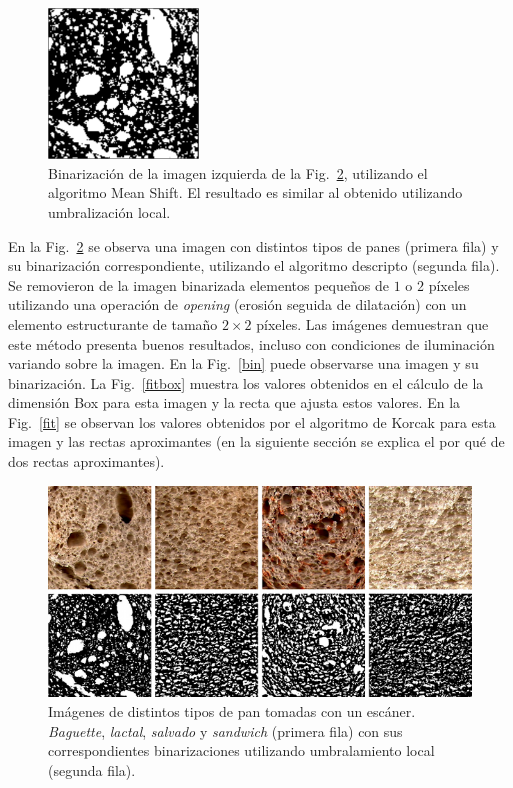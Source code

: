 \begin{figure}[h!]
\centering
\includegraphics[width=4cm]{figures/meanshift}
\caption[Binarización utilizando el algoritmo Mean Shift.]{Binarización de la imagen izquierda de la Fig.~\ref{fig:bread}, utilizando el algoritmo Mean Shift. El resultado es similar al obtenido utilizando umbralización local.}
\label{fig:meanshift}
\end{figure}


En la Fig.~\ref{fig:bread} se observa una imagen con distintos tipos de panes (primera fila) y su binarización correspondiente, utilizando el algoritmo descripto (segunda fila).
Se removieron de la imagen binarizada elementos pequeños de $1$ o $2$ píxeles utilizando una operación de {\em opening} \cite{Gonzalez2006} (erosión seguida de dilatación) con un elemento estructurante de tamaño $2\times 2$ píxeles.
Las imágenes demuestran que este método presenta buenos resultados, incluso con condiciones de iluminación variando sobre la imagen.
En la Fig.~\ref{bin} puede observarse una imagen  y su binarizaci\'on.
La Fig.~\ref{fitbox} muestra los valores obtenidos en el c\'alculo de la dimensi\'on Box para esta imagen y la recta que ajusta estos valores. 
En la Fig.~\ref{fit} se observan los valores obtenidos por el algoritmo de Korcak para esta imagen y las rectas aproximantes (en la siguiente secci\'on se explica el por qu\'e de dos rectas aproximantes).


\begin{figure}[h!]
\centering
\includegraphics[width=12cm]{figures/binarizaciones}
\caption[Imágenes de distintos tipos de pan tomadas con un escáner.]{Imágenes de distintos tipos de pan tomadas con un escáner. {\em Baguette}, {\em lactal}, {\em salvado} y {\em sandwich} (primera fila) con sus correspondientes binarizaciones utilizando umbralamiento local (segunda fila).}
\label{fig:bread}
\end{figure}


